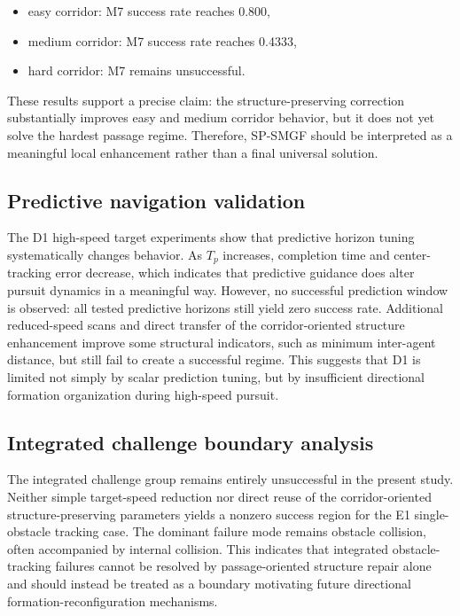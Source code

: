 \documentclass[utf8]{FrontiersinHarvard}
\begin{document}
\begin{itemize}
    \item easy corridor: M7 success rate reaches 0.800,
    \item medium corridor: M7 success rate reaches 0.4333,
    \item hard corridor: M7 remains unsuccessful.
\end{itemize}

These results support a precise claim: the structure-preserving correction substantially improves easy and medium corridor behavior, but it does not yet solve the hardest passage regime. Therefore, SP-SMGF should be interpreted as a meaningful local enhancement rather than a final universal solution.

\subsection{Predictive navigation validation}

The D1 high-speed target experiments show that predictive horizon tuning systematically changes behavior. As $T_p$ increases, completion time and center-tracking error decrease, which indicates that predictive guidance does alter pursuit dynamics in a meaningful way. However, no successful prediction window is observed: all tested predictive horizons still yield zero success rate. Additional reduced-speed scans and direct transfer of the corridor-oriented structure enhancement improve some structural indicators, such as minimum inter-agent distance, but still fail to create a successful regime. This suggests that D1 is limited not simply by scalar prediction tuning, but by insufficient directional formation organization during high-speed pursuit.

\subsection{Integrated challenge boundary analysis}

The integrated challenge group remains entirely unsuccessful in the present study. Neither simple target-speed reduction nor direct reuse of the corridor-oriented structure-preserving parameters yields a nonzero success region for the E1 single-obstacle tracking case. The dominant failure mode remains obstacle collision, often accompanied by internal collision. This indicates that integrated obstacle-tracking failures cannot be resolved by passage-oriented structure repair alone and should instead be treated as a boundary motivating future directional formation-reconfiguration mechanisms.
\end{document}
